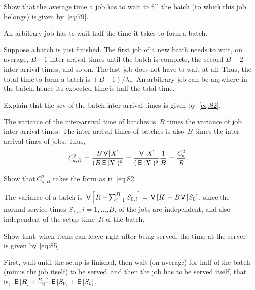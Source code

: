 \documentclass[stochastic-or.tex]{subfiles}
\begin{document}
\begin{exercise}\label{ex:48}
  Show that the average time a job has to wait to fill the batch (to which this job belongs) is given by~\cref{eq:79}.
\begin{hint}
An arbitrary job has to wait half the time it takes  to form a batch.
 \end{hint}
\begin{solution}
  Suppose a batch is just finished.
  The first job of a new batch needs to wait, on average, $B-1$ inter-arrival times until the batch is complete, the second $B-2$ inter-arrival times, and so on.
  The last job does not have to wait at all.
  Thus, the total time to form a batch is $(B-1)/\lambda_r$.
  An arbitrary job can be anywhere in the batch, hence its expected time is half the total time.
\end{solution}
\end{exercise}


\begin{exercise}\label{ex:490}
Explain that the scv of the batch inter-arrival times is given by~\cref{eq:82}.
\begin{solution}
The variance of the inter-arrival time of batches is~$B$ times the variance of job inter-arrival times. The inter-arrival times of batches is also~$B$ times the inter-arrival times of jobs. Thus,
\begin{equation*}
 C_{a,B}^2 = \frac{B \,\mathsf{V}\left[X\right]}{(B \,\mathsf{E}\left[X\right])^2} = \frac{\,\mathsf{V}\left[X\right]}{(\,\mathsf{E}\left[X\right])^2} \frac 1 B = \frac{C_a^2}{B}.
\end{equation*}
\end{solution}
\end{exercise}


\begin{exercise}\label{ex:491}
Show that $C_{s,B}^2$ takes the form as in~\cref{eq:82}.
\begin{solution}
 The variance of a batch is $\,\mathsf{V}\left[R+\sum_{i=1}^B S_{0,i} \right] = \,\mathsf{V}\left[R\right] + B\,\mathsf{V}\left[S_0\right]$, since the normal service times $S_{0,i}, i=1,\ldots,B$, of the jobs are independent, and also independent of the setup time~$R$ of the batch.
\end{solution}
\end{exercise}

\begin{exercise}\label{ex:492}
Show that, when items can leave right after being served, the time at the server is given by~\cref{eq:85}
\begin{solution}
 First, wait until the setup is finished, then wait (on average) for half of the batch (minus the job itself) to be served, and then the job has to be served itself, that is,
$\,\mathsf{E}\left[R\right] + \frac{B-1}{2}\,\mathsf{E}\left[S_0\right] +\,\mathsf{E}\left[S_0\right]$.
\end{solution}
\end{exercise}




\end{document}

